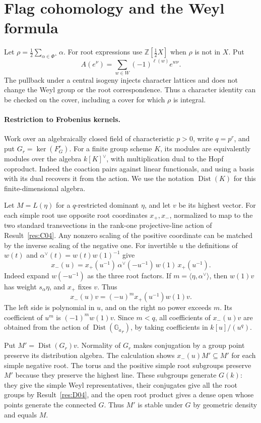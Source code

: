 \documentclass[11pt,a4paper,openany,oneside]{book}
\theoremstyle{resultstyle}
\theoremstyle{definition}
\numberwithin{equation}{chapter}
\newcommand{\Ga}{\mathbb{G}_a}
\begin{document}
\section{Flag cohomology and the Weyl formula}

Let \(\rho=\frac12\sum_{\alpha\in\Phi^+}\alpha\). For root expressions use \(\mathbb Z[\frac12 X]\) when \(\rho\) is not in \(X\). Put
\[
 A(e^\nu)=\sum_{w\in W}(-1)^{\ell(w)}e^{w\nu}.
\]
The pullback under a central isogeny injects character lattices and does not change the Weyl group or the root correspondence. Thus a character identity can be checked on the cover, including a cover for which \(\rho\) is integral.

\paragraph{Restriction to Frobenius kernels.}
Work over an algebraically closed field of characteristic \(p>0\),
write \(q=p^r\), and put \(G_r=\ker(F_G^r)\).
For a finite group scheme \(K\), its modules are equivalently
modules over the algebra \(k[K]^\vee\), with multiplication
dual to the Hopf coproduct. Indeed the coaction pairs against
linear functionals, and using a basis with its dual recovers it
from the action. We use the notation \(\operatorname{Dist}(K)\)
for this finite-dimensional algebra.

Let \(M=L(\eta)\) for a \(q\)-restricted dominant \(\eta\),
and let \(v\) be its highest vector. For each simple root use
opposite root coordinates \(x_+,x_-\), normalized to map
to the two standard transvections in the rank-one
projective-line action of Result~\ref{res:C04}.
Any nonzero scaling of the positive coordinate can be
matched by the inverse scaling of the negative one.
For invertible \(u\) the definitions of \(w(t)\) and
\(\alpha^\vee(t)=w(t)w(1)^{-1}\) give
\[
 x_-(u)=x_+(u^{-1})\,\alpha^\vee(-u^{-1})\,w(1)\,
                      x_+(u^{-1}).
\]
Indeed expand \(w(-u^{-1})\) as the three root factors.
If \(m=\langle\eta,\alpha^\vee\rangle\), then
\(w(1)v\) has weight \(s_\alpha\eta\), and \(x_+\) fixes \(v\).
Thus
\[
 x_-(u)v=(-u)^m x_+(u^{-1})w(1)v .
\]
The left side is polynomial in \(u\), and on the right no
power exceeds \(m\). Its coefficient of \(u^m\) is
\((-1)^m w(1)v\). Since \(m<q\), all coefficients of
\(x_-(u)v\) are obtained from the action of
\(\operatorname{Dist}({\Ga}_r)\), by taking coefficients in
\(k[u]/(u^q)\).

Put \(M'=\operatorname{Dist}(G_r)v\). Normality of \(G_r\)
makes conjugation by a group point preserve its distribution
algebra. The calculation shows \(x_-(u)M'\subseteq M'\)
for each simple negative root. The torus and the positive
simple root subgroups preserve \(M'\) because they preserve
the highest line. These subgroups generate \(G(k)\):
they give the simple Weyl representatives, their conjugates
give all the root groups by Result~\ref{res:D04}, and the
open root product gives a dense open whose points generate
the connected \(G\). Thus \(M'\) is stable under \(G\)
by geometric density and equals \(M\).
\end{document}
